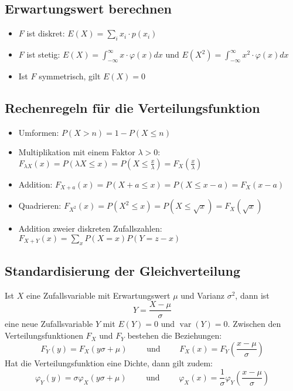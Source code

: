 \subsection{Erwartungswert berechnen}
\begin{itemize}
  \item $F$ ist diskret: $E(X) = \sum_i x_i \cdot p(x_i)$ %
  \item $F$ ist stetig: $E(X) = \int_{-\infty}^{\infty}x \cdot \varphi(x)dx$
    und $E(X^2) = \int_{-\infty}^{\infty}x^2 \cdot \varphi(x)dx$
  \item Ist $F$ symmetrisch, gilt $E(X) = 0$
\end{itemize}

\subsection{Rechenregeln für die Verteilungsfunktion}
\begin{itemize}
  \item Umformen: $P(X>n) = 1 - P(X \le n)$
  \item Multiplikation mit einem Faktor $\lambda > 0$: $F_{\lambda X}(x)=
    P(\lambda X \le x) = P(X \le \frac{x}{\lambda}) =
    F_X(\frac{x}{\lambda})$
  \item Addition: $F_{X+a}(x) = P(X+a \le x) = P(X \le x-a) = F_X(x-a)$
  \item Quadrieren: $F_{X^2}(x) = P(X^2 \le x) = P(X \le \sqrt{x}) =
    F_X(\sqrt{x})$
  \item Addition zweier diskreten Zufallszahlen:
    $F_{X+Y}(x) = \sum_x P(X=x)P(Y=z-x)$
\end{itemize}

\subsection{Standardisierung der Gleichverteilung}
Ist $X$ eine Zufallsvariable mit Erwartungswert $\mu$ und Varianz
$\sigma^2$, dann ist
\[ Y = \frac{X-\mu}{\sigma} \]
eine neue Zufallsvariable $Y$ mit $E(Y) = 0$ und $\operatorname{var}(Y) = 0$.
Zwischen den Verteilungsfunktionen $F_X$ und $F_Y$ bestehen die
Beziehungen:
\[ F_Y(y) = F_X(y\sigma+\mu) \qquad \text{ und } \qquad
  F_X(x)=F_Y\left(\frac{x-\mu}{\sigma}\right) \]
Hat die Verteilungsfunktion eine Dichte, dann gilt zudem:
\[ \varphi_Y(y) = \sigma \varphi_X(y\sigma+\mu) \qquad \text{ und }
  \qquad \varphi_X(x) = \frac{1}{\sigma}
  \varphi_Y\left(\frac{x-\mu}\sigma\right) \]

